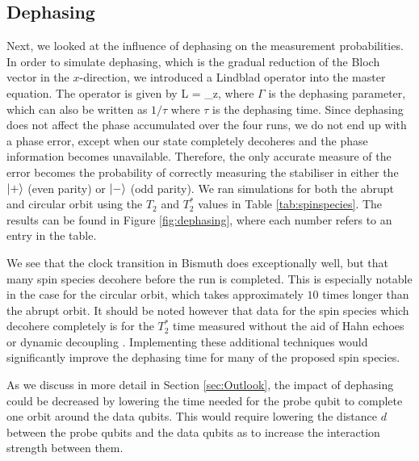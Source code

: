 \fi




\subsection{Dephasing}
Next, we looked at the influence of dephasing on the measurement probabilities. In order to simulate dephasing, which is the gradual reduction of the Bloch vector in the $x$-direction, we introduced a Lindblad operator into the master equation. The operator is given by 
\beq
L  = \sqrt{\Gamma} \sigma_z,
\eeq
where $\Gamma$ is the dephasing parameter, which can also be written as $1/\tau$ where $\tau$ is the dephasing time. Since dephasing does not affect the phase accumulated over the four runs, we do not end up with a phase error, except when our state completely decoheres and the phase information becomes unavailable. Therefore, the only accurate measure of the error becomes the probability of correctly measuring the stabiliser in either the $\ket{+}$ (even parity) or $\ket{-}$ (odd parity). We ran simulations for both the abrupt and circular orbit using the $T_2$ and $T_2^*$ values in Table \ref{tab:spinspecies}. The results can be found in Figure \ref{fig:dephasing}, where each number refers to an entry in the table. 

We see that the clock transition in Bismuth does exceptionally well, but that many spin species decohere before the run is completed. This is especially notable in the case for the circular orbit, which takes approximately $10$ times longer than the abrupt orbit. It should be noted however that data for the spin species which decohere completely is for the $T_2^*$ time measured without the aid of Hahn echoes \cite{hahn} or dynamic decoupling \cite{something}. Implementing these additional techniques would significantly improve the dephasing time for many of the proposed spin species. 

As we discuss in more detail in Section \ref{sec:Outlook}, the impact of dephasing could be decreased by lowering the time needed for the probe qubit to complete one orbit around the data qubits. This would require lowering the distance $d$ between the probe qubits and the data qubits as to increase the interaction strength between them. 


\iffalse

